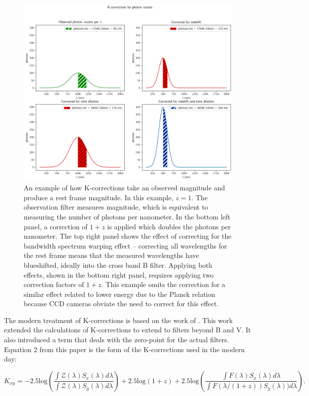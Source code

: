 \documentclass{article}
\begin{document}
\begin{figure}[h]
  \includegraphics[width=\linewidth]{K-corrections_for_photon_counts.png}
  \caption{An example of how K-corrections take an observed magnitude and
  produce a rest frame magnitude. In this example, $z=1$. The observation
  filter measures magnitude, which is equivalent to measuring the number of
  photons per nanometer. In the bottom left panel, a correction of $1+z$ is
  applied which doubles the photons per nanometer. The top right panel shows
  the effect of correcting for the bandwidth spectrum warping effect --
  correcting all wavelengths for the rest frame means that the measured
  wavelengths have blueshifted, ideally into the cross band B filter. Applying
  both effects, shown in the bottom right panel, requires applying two
  correction factors of $1+z$. This example omits the correction for a similar
  effect related to lower energy due to the Planck relation because CCD cameras
  obviate the need to correct for this effect.
  }
  \label{fig:k-example}
\end{figure}

The modern treatment of K-corrections is based on the work of \citet{kim1996}.
This work extended the calculations of K-corrections to extend to filters
beyond B and V. It also introduced a term that deals with the zero-point for the
actual filters. Equation 2 from this paper is the form of the K-corrections
used in the modern day:

\begin{equation}
\label{eq:kim2}
  K_{xy} =
    -2.5\text{log} \left(
      \frac{\int \mathcal{Z}(\lambda)S_x(\lambda)d\lambda}
           {\int \mathcal{Z}(\lambda)S_y(\lambda)d\lambda}\right)
    + 2.5\text{log}(1+z)
    + 2.5\text{log}\left(
      \frac{\int F(\lambda)S_x(\lambda)d\lambda}
           {\int F(\lambda/(1+z))S_y(\lambda))d\lambda}\right).
\end{equation}
\end{document}
